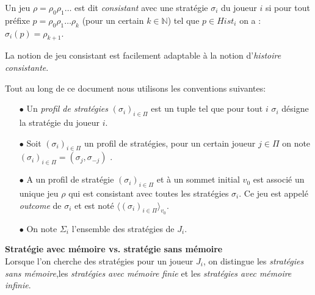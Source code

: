 \begin{defi}	
	Un jeu $\rho = \rho _{0}  \rho _{1} \ldots$ est dit \textit{consistant} avec une stratégie $\sigma _{i}$ du joueur $i$ si pour tout préfixe $p = \rho _{0}\rho _{1}\ldots \rho _{k}$ (pour un certain $k \in \mathbb{N}$) tel que $p \in Hist_{i}$ on a : $\sigma _{i}(p) = \rho_{k+1}$.	
\end{defi}

\begin{rem}
	La notion de jeu consistant est facilement adaptable à la notion d'\textit{histoire consistante}.
\end{rem}

\begin{notations}
	Tout au long de ce document nous utilisons les conventions suivantes:
	\begin{enumerate}
		\item[$\bullet$] Un \textit{profil de stratégies} $(\sigma _{i})_{i \in \Pi}$ est un tuple tel que pour tout $i$ $\sigma _{i}$ désigne la stratégie du 	joueur $i$. 
				
		\item[$\bullet$] Soit  $(\sigma _{i})_{i \in \Pi}$ un profil de stratégies, pour un certain joueur $j\in \Pi $ on note $(\sigma _{i})_{i \in \Pi} = ( \sigma _{j},\sigma _{-j})$ .
		
		\item[$\bullet$] A un profil de stratégie $(\sigma _{i})_{i \in \Pi}$ et à un sommet initial $v_{0}$ est associé un unique jeu $\rho$ qui est consistant avec toutes les stratégies $\sigma _{i}$. Ce jeu est appelé \textit{outcome} de $\sigma _{i}$ et est noté $\langle (\sigma _{i})_{i\in \Pi} \rangle_{v_0}$.
		
		\item[$\bullet$] On note $\Sigma _{i}$ l'ensemble des stratégies de $J_{i}$.
		
	\end{enumerate}
\end{notations}
		



\noindent\textbf{Stratégie avec mémoire vs. stratégie sans mémoire}\\



Lorsque l'on cherche des stratégies pour un joueur $J_{i}$, on distingue les \textit{stratégies sans mémoire},les \textit{stratégies avec mémoire finie} et les \textit{stratégies avec mémoire infinie}.

